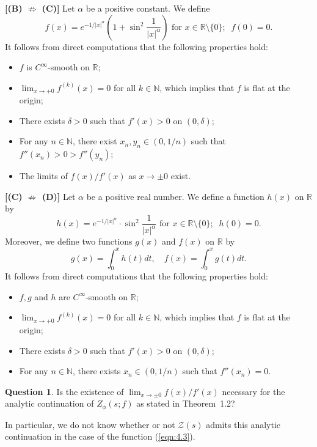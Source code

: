 \documentclass[12pt]{amsart}
\numberwithin{equation}{section}
\theoremstyle{definition}
\newtheorem{question}[theorem]{Question}
\theoremstyle{remark}
\newcommand{\R}{{\mathbb R}}
\newcommand{\N}{{\mathbb N}}
\newcommand{\1}{{\bf 1}}
\begin{document}
\medskip
{\bf [(B) $\not\Rightarrow$ (C)] } \quad
%
Let $\alpha$ be a positive constant. 
We define 
\begin{equation*}\label{eqn:4.4}
f(x)= e^{-1/|x|^\alpha}\left(1+\sin^2\frac{1}{|x|^{\alpha}}\right)
\text{ for } x \in\R\setminus\{0\}; \;\;
f(0)=0.
\end{equation*}
It follows from direct computations 
that the following properties hold:
\begin{itemize}
\item $f$ is $C^{\infty}$-smooth on $\R$;
\item $\lim_{x\to +0}f^{(k)}(x)=0$ for all $k\in\N$, 
which implies that $f$ is flat at the origin;  
\item There exists $\delta>0$ such that 
$f'(x)>0$ on $(0,\delta)$;
\item For any $n\in\N$, 
there exist $x_n, y_n\in (0,1/n)$ such that 
$f''(x_n)>0>f''(y_n)$; 
\item The limits of 
$f(x)/f'(x)$ as $x\to\pm 0$ exist. 
\end{itemize} 


\medskip
{\bf [(C) $\not\Rightarrow$ (D)] } \quad
%
Let $\alpha$ be a positive real number. 
We define a function $h(x)$ on $\R$ by 
\begin{equation*}\label{eqn:4.}
h(x)= e^{-1/|x|^\alpha}\cdot 
\sin^2\frac{1}{|x|^{\alpha}}
\text{ for } x \in\R\setminus\{0\}; \;\;
h(0)=0.
\end{equation*}
Moreover, we define two functions 
$g(x)$ and $f(x)$ on $\R$ by 
\begin{equation*}
g(x)=\int_0^{x} h(t)dt, 
\quad 
f(x)=\int_0^x g(t)dt.
\end{equation*}
It follows from direct computations 
that the following properties hold:
\begin{itemize}
\item $f, g$ and $h$ are $C^{\infty}$-smooth on $\R$;
\item $\lim_{x\to +0}f^{(k)}(x)=0$ for all $k\in\N$, 
which implies that $f$ is flat at the origin;  
\item There exists $\delta>0$ such that 
$f'(x)>0$ on $(0,\delta)$;
\item For any $n\in\N$, 
there exists $x_n\in (0,1/n)$ such that 
$f''(x_n)=0$. 
\end{itemize} 





\begin{question}
Is the existence of 
$\lim_{x \to \pm 0} f(x)/f'(x)$
necessary for the analytic continuation 
of $Z_{\phi}(s; f)$ as stated in Theorem~1.2?
\end{question}
%
\noindent
In particular, 
we do not know whether or not 
${\mathcal Z}(s)$ admits this analytic continuation 
in the case of the function (\ref{eqn:4.3}).  
\end{document}
